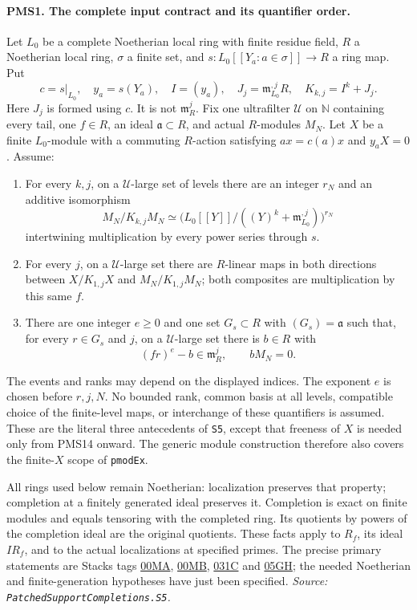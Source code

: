\paragraph{PMS1. The complete input contract and its quantifier order.}
\label{claim:PMS1}
Let $L_0$ be a complete Noetherian local ring with finite residue field,
$R$ a Noetherian local ring, $\sigma$ a finite set, and
$s:L_0[[Y_a:a\in\sigma]]\to R$ a ring map.  Put
\[
 c=s|_{L_0},\quad y_a=s(Y_a),\quad I=(y_a),\quad
 J_j=\mathfrak m_{L_0}^{,j}R,\quad K_{k,j}=I^k+J_j.
                                                        \tag{PMS.1}
\]
Here $J_j$ is formed using $c$.  It is not $\mathfrak m_R^j$.
Fix one ultrafilter $\mathscr U$ on $\mathbb N$ containing every tail,
one $f\in R$, an ideal $\mathfrak a\subset R$, and actual $R$-modules
$M_N$.  Let $X$ be a finite $L_0$-module with a commuting $R$-action
satisfying $a x=c(a)x$ and $y_aX=0$.  Assume:
\begin{enumerate}
\item For every $k,j$, on a $\mathscr U$-large set of levels there are
an integer $r_N$ and an additive isomorphism
\[
 M_N/K_{k,j}M_N\simeq
 \bigl(L_0[[Y]]/((Y)^k+\mathfrak m_{L_0}^{,j})\bigr)^{r_N}
                                                        \tag{PMS.2}
\]
intertwining multiplication by every power series through $s$.
\item For every $j$, on a $\mathscr U$-large set there are $R$-linear
maps in both directions between $X/K_{1,j}X$ and $M_N/K_{1,j}M_N$;
both composites are multiplication by this same $f$.
\item There are one integer $e\geq0$ and one set $G_s\subset R$
with $(G_s)=\mathfrak a$ such that, for every $r\in G_s$ and $j$,
on a $\mathscr U$-large set there is $b\in R$ with
\[
 (fr)^e-b\in\mathfrak m_R^j,\qquad bM_N=0.        \tag{PMS.3}
\]
\end{enumerate}
The events and ranks may depend on the displayed indices.  The exponent
$e$ is chosen before $r,j,N$.  No bounded rank, common basis at all
levels, compatible choice of the finite-level maps, or interchange of
these quantifiers is assumed.  These are the literal three antecedents
of \texttt{S5}, except that freeness of $X$ is needed only from PMS14
onward.  The generic module construction therefore also covers the
finite-$X$ scope of \texttt{pmodEx}.

All rings used below remain Noetherian: localization preserves that
property; completion at a finitely generated ideal preserves it.
Completion is exact on finite modules and equals tensoring with the
completed ring.  Its quotients by powers of the completion ideal are
the original quotients.  These facts apply to $R_f$, its ideal $IR_f$,
and to the actual localizations at specified primes.  The precise
primary statements are Stacks tags
\href{https://stacks.math.columbia.edu/tag/00MA}{00MA},
\href{https://stacks.math.columbia.edu/tag/00MB}{00MB},
\href{https://stacks.math.columbia.edu/tag/031C}{031C} and
\href{https://stacks.math.columbia.edu/tag/05GH}{05GH}; the needed
Noetherian and finite-generation hypotheses have just been specified.
\hfill\textit{Source: \texttt{PatchedSupportCompletions.S5}.}

